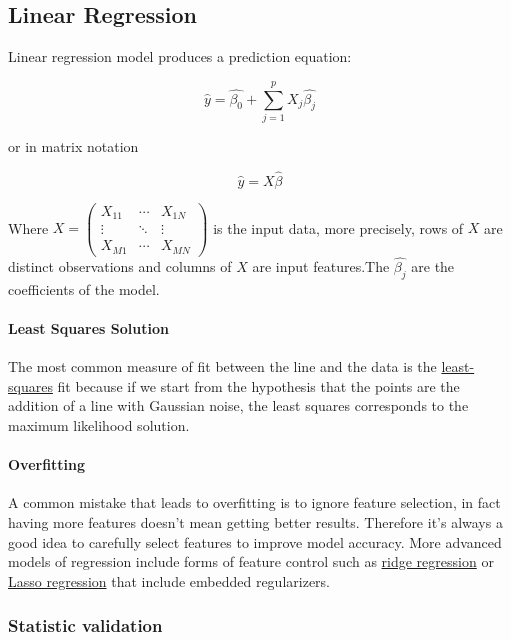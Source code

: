 \subsection{Linear Regression}

Linear regression model produces a prediction equation:

$$
\hat{y} = \hat{\beta_0} + \sum\limits_{j=1}^p  X_j \hat{ \beta_j}
$$

or in matrix notation

$$
\hat{y} =X \hat{ \beta}
$$

Where $X = \begin{pmatrix} X_{11} & \cdots & X_{1N} \\ \vdots & \ddots &  \vdots \\ X_{M1} & \cdots & X_{MN} \end{pmatrix}$ is the input data, more precisely, rows of $X$ are distinct observations and columns of $X$ are input features.The $\hat{\beta_j}$ are the coefficients of the model. 

\paragraph{Least Squares Solution}

The most common measure of fit between the line and the data is the \href{https://en.wikipedia.org/wiki/Least_squares}{least-squares} fit because if we start from the hypothesis that the points are the addition of a line with Gaussian noise, the least squares corresponds to the maximum likelihood solution.

\paragraph{Overfitting}

A common mistake that leads to overfitting is to ignore feature selection, in fact having more features doesn't mean getting better results. Therefore it's always a good idea to carefully select features to improve model accuracy. More advanced models of regression include forms of feature control such as \href{https://en.wikipedia.org/wiki/Tikhonov_regularization}{ridge regression} or \href{https://en.wikipedia.org/wiki/Lasso_(statistics)}{Lasso regression} that include embedded regularizers.

\subsubsection{Statistic validation}

